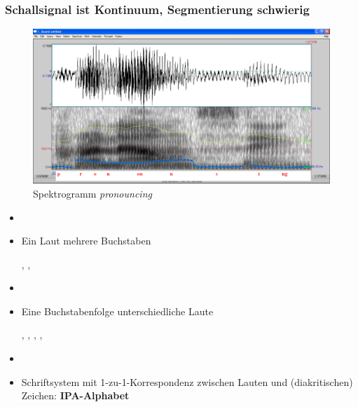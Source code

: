 \begin{frame}
\frametitle{Schallsignal ist Kontinuum, Segmentierung schwierig}

	\begin{figure}[H]
	\centering
	
	\includegraphics[scale=0.2]{material/04Pronouncing}
	\caption{Spektrogramm \emph{pronouncing}}
	\end{figure}	
	
\end{frame}


\begin{frame}

		\begin{itemize}
			\item[]
			\item Ein Laut \ras mehrere Buchstaben

			\ea \textipa{[s]} \ras {}, , 
			\z
			
			\item[]
			\item Eine Buchstabenfolge \ras unterschiedliche Laute

			\ea {} \ras {}, , , , 
			\z

			\item[]
			\item[\ras] Schriftsystem mit 1-zu-1-Korrespondenz zwischen Lauten und (diakritischen) Zeichen: \textbf{IPA-Alphabet}
		\end{itemize}
		
\end{frame}


